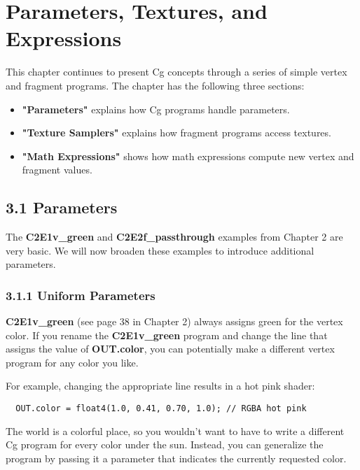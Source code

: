\documentclass[../main.tex]{subfiles}
\begin{document}
\chapter{Parameters, Textures, and Expressions}

This chapter continues to present Cg concepts through a series of simple vertex and fragment programs. The chapter has the following three sections:

\FloatBarrier
\begin{itemize}
\item \textbf{"Parameters"} explains how Cg programs handle parameters.
\item \textbf{"Texture Samplers"} explains how fragment programs access textures.
\item \textbf{"Math Expressions"} shows how math expressions compute new vertex and fragment values.
\end{itemize}

\section{3.1 Parameters}

The \textbf{C2E1v_green} and \textbf{C2E2f_passthrough} examples from Chapter 2 are very basic. We will now broaden these examples to introduce additional parameters.

\subsection{3.1.1 Uniform Parameters}

\textbf{C2E1v_green} (see page 38 in Chapter 2) always assigns green for the vertex color. If you rename the \textbf{C2E1v_green} program and change the line that assigns the value of \textbf{OUT.color}, you can potentially make a different vertex program for any color you like.

For example, changing the appropriate line results in a hot pink shader:

\FloatBarrier
\begin{lstlisting}
  OUT.color = float4(1.0, 0.41, 0.70, 1.0); // RGBA hot pink
\end{lstlisting}
\FloatBarrier

The world is a colorful place, so you wouldn't want to have to write a different Cg program for every color under the sun. Instead, you can generalize the program by passing it a parameter that indicates the currently requested color.
\end{document}
